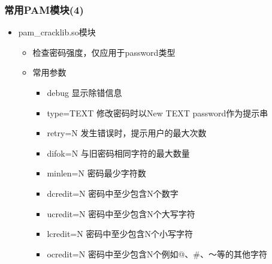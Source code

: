 \documentclass[xcolor=svgnames,presentation]{beamer}
\begin{document}
\begin{frame}
\frametitle{常用PAM模块(4)}
\label{sec-6-13}
\begin{itemize}

\item pam\_cracklib.so模块
\label{sec-6-13-1}%
\begin{itemize}

\item 检查密码强度，仅应用于password类型
\label{sec-6-13-1-1}%

\item 常用参数
\label{sec-6-13-1-2}%
\begin{itemize}

\item debug 显示除错信息
\label{sec-6-13-1-2-1}%

\item type=TEXT 修改密码时以New TEXT password作为提示串
\label{sec-6-13-1-2-2}%

\item retry=N 发生错误时，提示用户的最大次数
\label{sec-6-13-1-2-3}%

\item difok=N 与旧密码相同字符的最大数量
\label{sec-6-13-1-2-4}%

\item minlen=N 密码最少字符数
\label{sec-6-13-1-2-5}%

\item dcredit=N 密码中至少包含N个数字
\label{sec-6-13-1-2-6}%

\item ucredit=N 密码中至少包含N个大写字符
\label{sec-6-13-1-2-7}%

\item lcredit=N 密码中至少包含N个小写字符
\label{sec-6-13-1-2-8}%

\item ocredit=N 密码中至少包含N个例如@、\#、～等的其他字符
\label{sec-6-13-1-2-9}%
\end{itemize} %
\end{itemize} %
\end{itemize} %
\end{frame}
\end{document}
